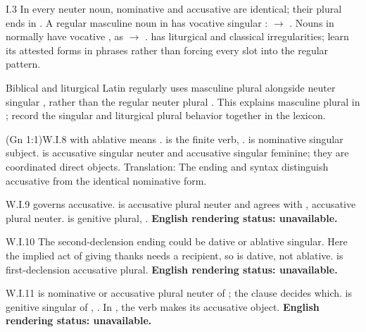 \begin{courseunit}{I.3}
In every neuter noun, nominative and accusative are identical; their plural
ends in . A regular masculine noun in  has vocative
singular :  $\rightarrow$ .
Nouns in  normally have vocative , as 
$\rightarrow$ .  has liturgical and classical
irregularities; learn its attested forms in phrases rather than forcing every
slot into the regular  pattern.

Biblical and liturgical Latin regularly uses masculine plural
 alongside neuter singular , rather
than the regular neuter plural . This explains masculine plural
 in ; record the singular and
liturgical plural behavior together in the lexicon.

\begin{workedexample}{ (Gn 1:1)}{W.I.8}
 with ablative  means .
 is the finite verb, .  is
nominative singular subject.  is accusative singular neuter and
 accusative singular feminine; they are coordinated direct
objects. Translation: 
The ending and syntax distinguish accusative  from the identical
nominative form.
\end{workedexample}

\begin{workedexample}{}{W.I.9}
 governs accusative.  is accusative plural neuter and
agrees with , accusative plural neuter.  is
genitive plural, .
\textbf{English rendering status: unavailable.}
\end{workedexample}

\begin{workedexample}{}{W.I.10}
The second-declension ending  could be dative or ablative singular.
Here the implied act of giving thanks needs a recipient, so  is
dative, not ablative.  is first-declension accusative plural.
\textbf{English rendering status: unavailable.}
\end{workedexample}

\begin{workedexample}{}{W.I.11}
 is nominative or accusative plural neuter of ;
the clause decides which.  is genitive singular of
, . In ,
the verb  makes  its accusative object.
\textbf{English rendering status: unavailable.}
\end{workedexample}


\end{courseunit}
